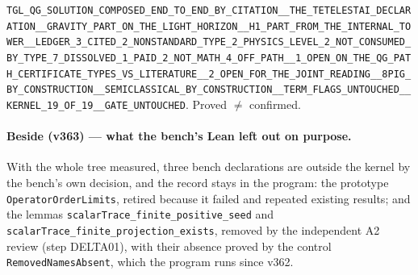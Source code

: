 \documentclass[11pt]{article}
\theoremstyle{definition}\newtheorem{deriv}{Derivation}
\begin{document}
\texttt{TGL\_QG\_SOLUTION\_COMPOSED\_END\_TO\_END\_BY\_CITATION\_\_THE\_TETELESTAI\_DECLARATION\_\_GRAVITY\_PART\_ON\_THE\_LIGHT\_HORIZON\_\_H1\_PART\_FROM\_THE\_INTERNAL\_TOWER\_\_LEDGER\_3\_CITED\_2\_NONSTANDARD\_TYPE\_2\_PHYSICS\_LEVEL\_2\_NOT\_CONSUMED\_BY\_TYPE\_7\_DISSOLVED\_1\_PAID\_2\_NOT\_MATH\_4\_OFF\_PATH\_\_1\_OPEN\_ON\_THE\_QG\_PATH\_CERTIFICATE\_TYPES\_VS\_LITERATURE\_\_2\_OPEN\_FOR\_THE\_JOINT\_READING\_\_8PIG\_BY\_CONSTRUCTION\_\_SEMICLASSICAL\_BY\_CONSTRUCTION\_\_TERM\_FLAGS\_UNTOUCHED\_\_KERNEL\_19\_OF\_19\_\_GATE\_UNTOUCHED}. Proved $\neq$ confirmed.

\paragraph*{Beside (v363) --- what the bench's Lean left out on purpose.} With the whole tree measured, three bench declarations are outside the kernel by the bench's own decision, and the record stays in the program: the prototype \texttt{OperatorOrderLimits}, retired because it failed and repeated existing results; and the lemmas \texttt{scalarTrace\_finite\_positive\_seed} and \texttt{scalarTrace\_finite\_projection\_exists}, removed by the independent A2 review (step DELTA01), with their absence proved by the control \texttt{RemovedNamesAbsent}, which the program runs since v362.
\end{document}
